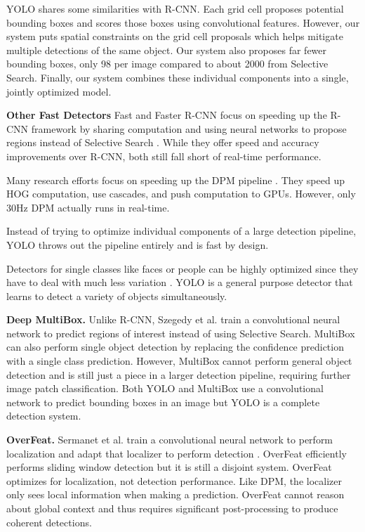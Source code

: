 \documentclass[10pt,twocolumn,letterpaper]{article}
\begin{document}
YOLO shares some similarities with R-CNN. Each grid cell proposes potential bounding boxes and scores those boxes using convolutional features. However, our system puts spatial constraints on the grid cell proposals which helps mitigate multiple detections of the same object. Our system also proposes far fewer bounding boxes, only 98 per image compared to about 2000 from Selective Search. Finally, our system combines these individual components into a single, jointly optimized model.

\textbf{Other Fast Detectors} Fast and Faster R-CNN focus on speeding up the R-CNN framework by sharing computation and using neural networks to propose regions instead of Selective Search \cite{DBLP:journals/corr/Girshick15} \cite{ren2015faster}. While they offer speed and accuracy improvements over R-CNN, both still fall short of real-time performance.

Many research efforts focus on speeding up the DPM pipeline \cite{sadeghi201430hz} \cite{yan2014fastest} \cite{dean2013fast}. They speed up HOG computation, use cascades, and push computation to GPUs. However, only 30Hz DPM \cite{sadeghi201430hz} actually runs in real-time.

Instead of trying to optimize individual components of a large detection pipeline, YOLO throws out the pipeline entirely and is fast by design.

Detectors for single classes like faces or people can be highly optimized since they have to deal with much less variation \cite{viola2004robust}. YOLO is a general purpose detector that learns to detect a variety of objects simultaneously.

\textbf{Deep MultiBox.} Unlike R-CNN, Szegedy et al. train a convolutional neural network to predict regions of interest \cite{erhan2014scalable} instead of using Selective Search. MultiBox can also perform single object detection by replacing the confidence prediction with a single class prediction. However, MultiBox cannot perform general object detection and is still just a piece in a larger detection pipeline, requiring further image patch classification. Both YOLO and MultiBox use a convolutional network to predict bounding boxes in an image but YOLO is a complete detection system.

\textbf{OverFeat.} Sermanet et al. train a convolutional neural network to perform localization and adapt that localizer to perform detection \cite{DBLP:journals/corr/SermanetEZMFL13}. OverFeat efficiently performs sliding window detection but it is still a disjoint system. OverFeat optimizes for localization, not detection performance. Like DPM, the localizer only sees local information when making a prediction. OverFeat cannot reason about global context and thus requires significant post-processing to produce coherent detections.
\end{document}
